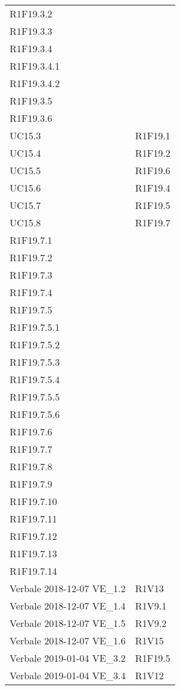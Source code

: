 \begin{longtable}{ >{\centering}p{}
			>{\centering}p{}}
	R1F19.3.2\\
	R1F19.3.3\\
	R1F19.3.4\\
	R1F19.3.4.1\\
	R1F19.3.4.2\\
	R1F19.3.5\\
	R1F19.3.6	\tabularnewline
	UC15.3	&	R1F19.1	\tabularnewline
	UC15.4	&	R1F19.2	\tabularnewline
	UC15.5	&	R1F19.6	\tabularnewline
	UC15.6	&	R1F19.4	\tabularnewline
	UC15.7	&	R1F19.5	\tabularnewline
	UC15.8	&	R1F19.7\\ 
	R1F19.7.1\\ 
	R1F19.7.2\\ 
	R1F19.7.3\\ 
	R1F19.7.4\\ 
	R1F19.7.5\\ 
	R1F19.7.5.1\\ 
	R1F19.7.5.2\\ 
	R1F19.7.5.3\\ 
	R1F19.7.5.4\\ 
	R1F19.7.5.5\\ 
	R1F19.7.5.6\\ 
	R1F19.7.6\\ 
	R1F19.7.7\\ 
	R1F19.7.8\\ 
	R1F19.7.9\\ 
	R1F19.7.10\\ 
	R1F19.7.11\\ 
	R1F19.7.12\\ 
	R1F19.7.13\\ 
	R1F19.7.14	\tabularnewline
	Verbale 2018-12-07 VE\_1.2	&	R1V13	\tabularnewline
	Verbale 2018-12-07 VE\_1.4	&	R1V9.1	\tabularnewline
	Verbale 2018-12-07 VE\_1.5	&	R1V9.2	\tabularnewline
	Verbale 2018-12-07 VE\_1.6	&	R1V15	\tabularnewline
	Verbale 2019-01-04 VE\_3.2	&	R1F19.5	\tabularnewline
	Verbale 2019-01-04 VE\_3.4	&	R1V12	\tabularnewline
	
	
	\end{longtable}
